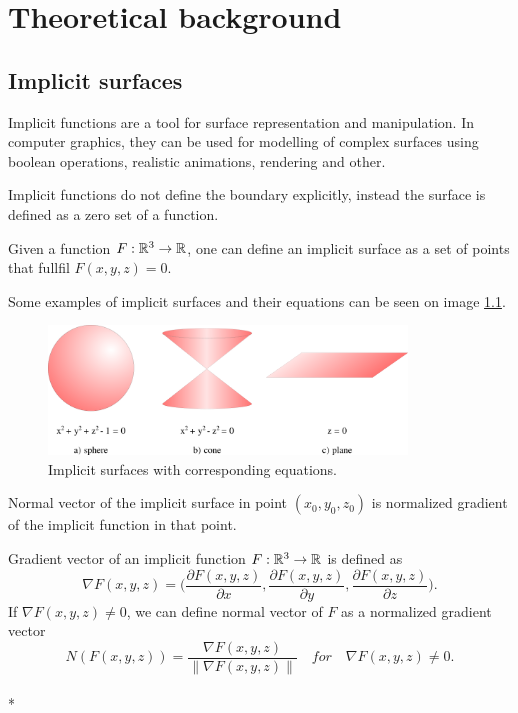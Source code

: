 \chapter{Theoretical background}
\label{chap2} %

\section*{Implicit surfaces}
\label{sub2.1}

Implicit functions are a tool for surface representation and manipulation.
In computer graphics, they can be used for modelling of complex surfaces
using boolean operations, realistic animations, rendering and other.

Implicit functions do not define the boundary explicitly, instead
the surface is defined as a zero set of a function.
\begin{definition}
    Given a function $F: \mathbb{R}^3 \to \mathbb{R}$, one can define an implicit surface
    as a set of points that fullfil $F(x, y, z) = 0$.
\end{definition}

Some examples of implicit surfaces and their equations can be seen on
image \ref{img:1}.

\begin{figure}
    \centerline{\includegraphics[width=0.85\textwidth]{images/img1}}
    \caption[Implicit surfaces with corresponding equations]
    {Implicit surfaces with corresponding equations.}
    \label{img:1}
\end{figure}

Normal vector of the implicit surface in point $(x_0, y_0, z_0)$ is
normalized gradient of the implicit function in that point.

\begin{definition}
    Gradient vector of an implicit function $F:\mathbb{R}^3 \to \mathbb{R}$ is defined as 
    $$\nabla F(x, y, z) = \bigg(\frac{\partial F(x, y, z)}{\partial x}, \frac{\partial F(x, y, z)}{\partial y}, 
    \frac{\partial F(x, y, z)}{\partial z}\bigg).$$
    If $\nabla F(x,y,z) \neq 0$, we can define normal vector of $F$ as 
    a normalized gradient vector
    $$N(F(x, y, z))  = \frac{\nabla F(x, y, z)}{\| \nabla F(x, y, z) \|} \,\,\,\,\,\, for \,\,\,\,\,\,
    \nabla F(x,y,z) \neq 0.$$
    \\*
\end{definition}

